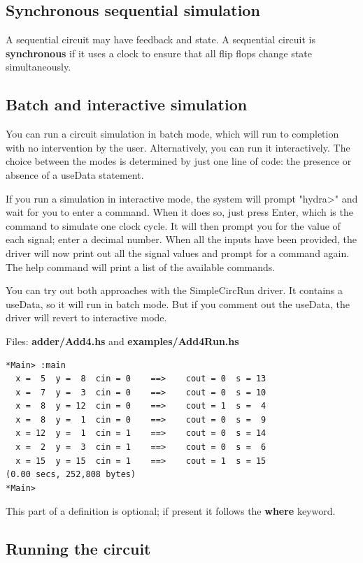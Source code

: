 \documentclass[]{svmono}
\begin{document}
\subsection*{Synchronous sequential simulation}
\label{sec:org90d5a5b}

A sequential circuit may have feedback and state.  A sequential
circuit is \textbf{synchronous} if it uses a clock to ensure that all flip
flops change state simultaneously.
\subsection*{Batch and interactive simulation}
\label{sec:org53189ed}

You can run a circuit simulation in batch mode, which will run to
completion with no intervention by the user.  Alternatively, you
can run it interactively.  The choice between the modes is
determined by just one line of code: the presence or absence of a
useData statement.

If you run a simulation in interactive mode, the system will
prompt "hydra>" and wait for you to enter a command.  When it does
so, just press Enter, which is the command to simulate one clock
cycle.  It will then prompt you for the value of each signal;
enter a decimal number.  When all the inputs have been provided,
the driver will now print out all the signal values and prompt for
a command again.  The help command will print a list of the
available commands.

You can try out both approaches with the SimpleCircRun driver.  It
contains a useData, so it will run in batch mode.  But if you
comment out the useData, the driver will revert to interactive
mode.

Files: \textbf{adder/Add4.hs} and \textbf{examples/Add4Run.hs}

\begin{verbatim}
*Main> :main
  x =  5  y =  8  cin = 0    ==>    cout = 0  s = 13
  x =  7  y =  3  cin = 0    ==>    cout = 0  s = 10
  x =  8  y = 12  cin = 0    ==>    cout = 1  s =  4
  x =  8  y =  1  cin = 0    ==>    cout = 0  s =  9
  x = 12  y =  1  cin = 1    ==>    cout = 0  s = 14
  x =  2  y =  3  cin = 1    ==>    cout = 0  s =  6
  x = 15  y = 15  cin = 1    ==>    cout = 1  s = 15
(0.00 secs, 252,808 bytes)
*Main>
\end{verbatim}

This part of a definition is optional; if present it follows the
\textbf{where} keyword.
\subsection*{Running the circuit}
\label{sec:org2d80f3a}
\end{document}
